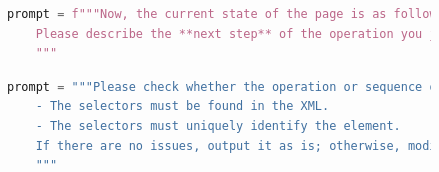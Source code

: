 \documentclass[twocolumn, 10pt]{article}
\begin{document}
\begin{figure}[h]
\centering
\begin{lstlisting}[language=python, caption=后续事件生成]
    prompt = f"""Now, the current state of the page is as follows: {get_xml(self.device.u2)}
    Please describe the **next step** of the operation you just performed in JSON format, using the same format as above.
    """
\end{lstlisting}
\label{fig:next}
\end{figure}

\begin{figure}[h]
\centering
\begin{lstlisting}[language=python, caption=操作检查]
    prompt = """Please check whether the operation or sequence of operations you just generated meets the requirements:
    - The selectors must be found in the XML.
    - The selectors must uniquely identify the element.
    If there are no issues, output it as is; otherwise, modify it accordingly.
    """
\end{lstlisting}
\label{fig:check}
\end{figure}



\end{document}
